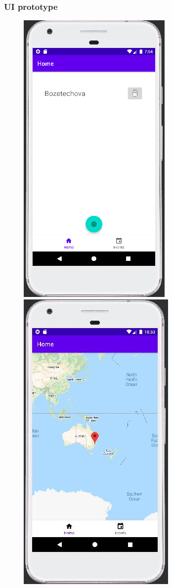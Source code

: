 \documentclass[10pt,xcolor=pdflatex,hyperref={unicode}]{beamer}
\begin{document}
\begin{frame}\frametitle{UI prototype}
    \begin{figure}
        \centering
        \begin{minipage}{0.3\textwidth}
            \centering
            \includegraphics[width=0.25\paperwidth]{img/ui1.jpg}
        \end{minipage}
        \hfill
        \begin{minipage}{0.3\textwidth}
            \centering
            \includegraphics[width=0.25\paperwidth]{img/ui2.jpg}

\end{minipage}
\end{figure}
\end{frame}
\end{document}
